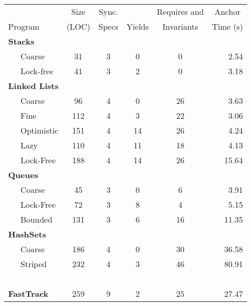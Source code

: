 \documentclass{article}
\begin{document}
       \begin{tabular}{llccccr}
       & & \multicolumn{1}{c}{Size}  & \multicolumn{1}{c}{Sync.} & & \multicolumn{1}{c}{Requires and}  & \multicolumn{1}{c}{Anchor}  \\
        \multicolumn{2}{l}{Program} & \multicolumn{1}{c}{(LOC)}  & \multicolumn{1}{c}{Specs} & \multicolumn{1}{c}{Yields} &  \multicolumn{1}{c}{Invariants} & \multicolumn{1}{c}{Time (s)} \\
        \toprule
      
\multicolumn{7}{l}{\bf Stacks}\\
 &  Coarse  &  31  &  3  &  0  &  0  &  2.54 \\   %
 &  Lock-free  &  41  &  3  &  2  &  0  &  3.18 \\   %
\multicolumn{7}{l}{\bf Linked Lists}\\
 &  Coarse  &  96  &  4  &  0  &  26  &  3.63 \\   %
 &  Fine  &  112  &  4  &  3  &  22  &  3.06 \\   %
 &  Optimistic  &  151  &  4  &  14  &  26  &  4.24 \\   %
 &  Lazy  &  110  &  4  &  11  &  18  &  4.13 \\   %
 &  Lock-Free  &  188  &  4  &  14  &  26  &  15.64 \\   %
\multicolumn{7}{l}{\bf Queues}\\
 &  Coarse  &  45  &  3  &  0  &  6  &  3.91 \\   %
 &  Lock-Free  &  72  &  3  &  8  &  4  &  5.15 \\   %
 &  Bounded  &  131  &  3  &  6  &  16  &  11.35 \\   %
\multicolumn{7}{l}{\bf HashSets}\\
 &  Coarse  &  186  &  4  &  0  &  30  &  36.58 \\   %
 &  Striped  &  232  &  4  &  3  &  46  &  80.91 \\   %
~\\[-1ex]
 \multicolumn{2}{l}{\bf FastTrack}  &  259  &  9  &  2  &  25  &  27.47 \\   %

\bottomrule
\end{tabular}
\end{document}
